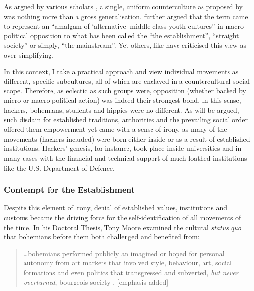 As argued by various scholars \citep{mcgregor75,spates76,eder90}, a single, uniform counterculture as proposed by \citeauthor{roszak69} was nothing more than a gross generalisation. \citet[p.148]{hebdige87} further argued that the term came to represent an ``amalgam of
`alternative' middle-class youth cultures'' in macro-political opposition to what has been called the ``the establishment'', ``straight society'' or simply, ``the mainstream''. Yet others, like \citet[p.87--88]{marchant03} have criticised this view as over simplifying.

In this context, I take a practical approach and view individual movements as different, specific subcultures, all of which are enclaved in a countercultural social scope. Therefore, as eclectic as such groups were, opposition (whether backed by micro or macro-political action) was indeed their strongest bond. In this sense, hackers, bohemians, students and hippies were no different. As will be argued, such disdain for established traditions, authorities and the prevailing social order offered them empowerment yet came with a sense of irony, as many of the movements (hackers included) were born either inside or as a result of established institutions. Hackers' genesis, for instance, took place inside universities and in many cases with the financial and technical support of much-loathed institutions like the U.S. Department of Defence.





\subsubsection{Contempt for the Establishment}

Despite this element of irony, denial of established values, institutions and customs became the driving force for the self-identification of all movements of the time. In his Doctoral Thesis, Tony Moore examined the cultural \textit{status quo} that bohemians before them both challenged and benefited from:

\begin{quote}
\ldots bohemians performed publicly an imagined or hoped for personal autonomy from art markets that involved style, behaviour, art, social formations and even politics that transgressed and subverted, \emph{but never overturned}, bourgeois society \citep[p.10]{moore07}. [emphasis added]
\end{quote}


